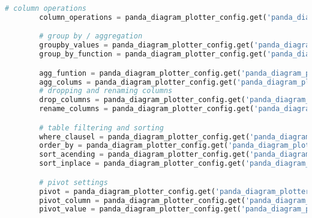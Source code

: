 \begin{lstlisting}[language=python, caption=Python LaTex - pandas\_data\_chart\_plotter.py CSV - Diagramm,captionpos=b,label={lst:pandas_data_chart_plotter},breaklines=true]
        # column operations
        column_operations = panda_diagram_plotter_config.get('panda_diagram_plotter').get(table_item).get('column_operations').get('datas')

        # group by / aggregation
        groupby_values = panda_diagram_plotter_config.get('panda_diagram_plotter').get(table_item).get('group_by')
        group_by_function = panda_diagram_plotter_config.get('panda_diagram_plotter').get(table_item).get('group_by_function')

        agg_funtion = panda_diagram_plotter_config.get('panda_diagram_plotter').get(table_item).get('agg_funtion')
        agg_colums = panda_diagram_plotter_config.get('panda_diagram_plotter').get(table_item).get('agg_colums')
        # dropping and renaming columns
        drop_columns = panda_diagram_plotter_config.get('panda_diagram_plotter').get(table_item).get('drop_columns')
        rename_columns = panda_diagram_plotter_config.get('panda_diagram_plotter').get(table_item).get('rename_columns')

        # table filtering and sorting
        where_clausel = panda_diagram_plotter_config.get('panda_diagram_plotter').get(table_item).get('where_clausel')
        order_by = panda_diagram_plotter_config.get('panda_diagram_plotter').get(table_item).get('sorting').get('order_by')
        sort_acending = panda_diagram_plotter_config.get('panda_diagram_plotter').get(table_item).get('sorting').get('sort_acending')
        sort_inplace = panda_diagram_plotter_config.get('panda_diagram_plotter').get(table_item).get('sorting').get('sort_inplace')

        # pivot settings
        pivot = panda_diagram_plotter_config.get('panda_diagram_plotter').get(table_item).get('pivot')
        pivot_column = panda_diagram_plotter_config.get('panda_diagram_plotter').get(table_item).get('pivot_columns')
        pivot_value = panda_diagram_plotter_config.get('panda_diagram_plotter').get(table_item).get('pivot_values')


\end{lstlisting}
